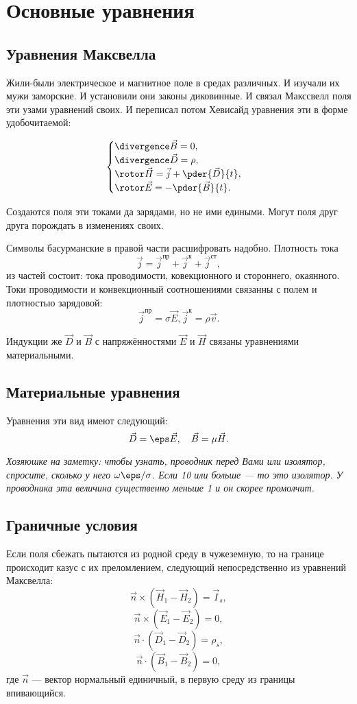 \chapter{Основные уравнения}
\section{Уравнения Максвелла}
  Жили-были электрическое и магнитное поле в средах различных. И изучали их мужи
  заморские. И установили они законы диковинные. И связал Макссвелл поля эти
  узами уравнений своих. И переписал потом Хевисайд уравнения эти в форме
  удобочитаемой:

  \[
    \begin{cases}
      \divergence\vec{B} = 0,\\
      \divergence\vec{D} = \rho,\\
      \rotor\vec{H} = \vec{j} + \pder{\vec{D}}{t},\\
      \rotor\vec{E} = -\pder{\vec{B}}{t}.
    \end{cases}
  \]

  Создаются поля эти токами да зарядами, но не ими едиными. Могут поля друг
  друга порождать в изменениях своих.

  Символы басурманские в правой части расшифровать надобно. Плотность тока
  \[
      \vec{j} = \vec{j}^\text{пр} + \vec{j}^\text{к} + \vec{j}^\text{ст},
  \]
  из частей состоит: тока проводимости, ковекционного и стороннего, окаянного.
  Токи проводимости и конвекционный соотношениями связанны с полем и плотностью
  зарядовой:
  \[
      \vec{j}^\text{пр} = \sigma\vec{E}, \vec{j}^\text{к} = \rho\vec{v}.
  \]

  Индукции же \( \vec{D} \) и \( \vec{B} \) с напряжённостями \( \vec{E} \) и
  \( \vec{H} \) связаны уравнениями материальными.

\section{Материальные уравнения}
  Уравнения эти вид имеют следующий:
  \[
      \vec{D} = \eps\vec{E},\quad
      \vec{B} = \mu\vec{H}.
  \]
    
  \textit{Хозяюшке на заметку: чтобы узнать, проводник перед Вами или изолятор,
  спросите, сколько у него \(\omega\eps/\sigma\). Если 10 или больше ---
  то это изолятор. У проводника эта величина существенно меньше 1 и он скорее
  промолчит.}

\section{Граничные условия}
  Если поля сбежать пытаются из родной среду в чужеземную, то на границе
  происходит казус с их преломлением, следующий непосредственно из уравнений
  Максвелла:
  \[
    \vec{n}\times(\vec{H}_1 - \vec{H}_2) = \vec{I}_s,
  \]
  \[
    \vec{n}\times(\vec{E}_1 - \vec{E}_2) = 0,
  \]
  \[
    \vec{n}\cdot(\vec{D}_1 - \vec{D}_2) = \rho_s,
  \]
  \[
    \vec{n}\cdot(\vec{B}_1 - \vec{B}_2) = 0,
  \]
  где \(\vec{n}\) --- вектор нормальный единичный, в первую среду из границы
  впивающийся.

